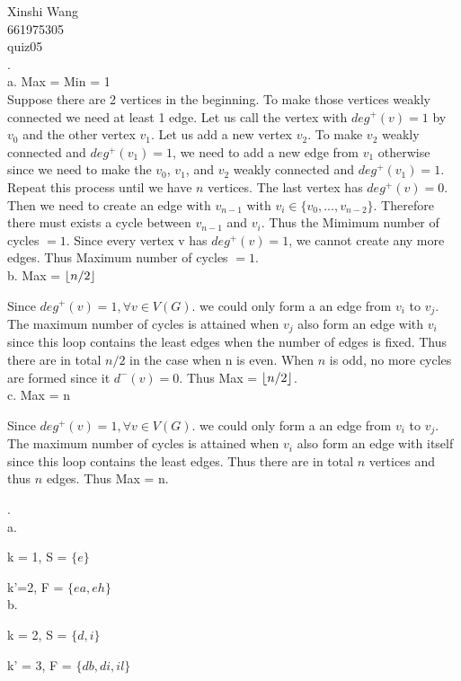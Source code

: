 \documentclass[12pt]{article}
\DeclarePairedDelimiter\floor{\lfloor}{\rfloor}
\begin{document}
	\noindent Xinshi Wang\\
	661975305\\
	quiz05\\
	
	.\\
	a. Max = Min = 1\\
	
	 Suppose there are 2 vertices in the beginning. To make those vertices weakly connected we need at least 1 edge. Let us call the vertex with $deg^+(v) = 1$ by $v_0$ and the other vertex $v_1$. Let us add a new vertex $v_2$. To make $v_2$ weakly connected and $deg^+(v_1) = 1$, we need to add a new edge from $v_1$ otherwise since we need to make the $v_0$, $v_1$, and $v_2$ weakly connected and $deg^+(v_1) = 1$. Repeat this process until we have $n$ vertices. The last vertex has $deg^+(v) = 0$. Then we need to create an edge with $v_{n-1}$ with $v_i \in  \{v_0,...,v_{n-2}\}$. Therefore there must exists a cycle between $v_{n-1}$ and $v_i$. Thus the Mimimum number of cycles $= 1$. Since every vertex v has $deg^+(v) = 1$, we cannot create any more edges. Thus Maximum number of cycles $= 1$.\\
	 
	\noindent b. Max = $\floor{n/2}$
	
		Since $deg^+(v) = 1, \forall v \in V(G)$. we could only form a an edge from $v_i$ to $v_j$. The maximum number of cycles is attained when $v_j$ also form an edge with $v_i$ since this loop contains the least edges when the number of edges is fixed. Thus there are in total $n/2$ in the case when n is even. When $n$ is odd, no more cycles are formed since it $d^-(v) = 0$. Thus Max = $\floor{n/2}$.\\
		
		
	\noindent c. Max = n
	
		Since $deg^+(v) = 1, \forall v \in V(G)$. we could only form a an edge from $v_i$ to $v_j$. The maximum number of cycles is attained when $v_i$ also form an edge with itself since this loop contains the least edges. Thus there are in total $n$ vertices and thus $n$ edges. Thus Max = n.
	
	.\\
	
	\noindent a.
	
	k = 1, S = $\{e\}$ 
	
	k'=2, F = $\{ea,eh\}$\\
	
	\noindent b.
	
	k = 2, S = $\{d,i\}$
	
	k' = 3, F = $\{db,di,il\}$ 
	
\end{document}
